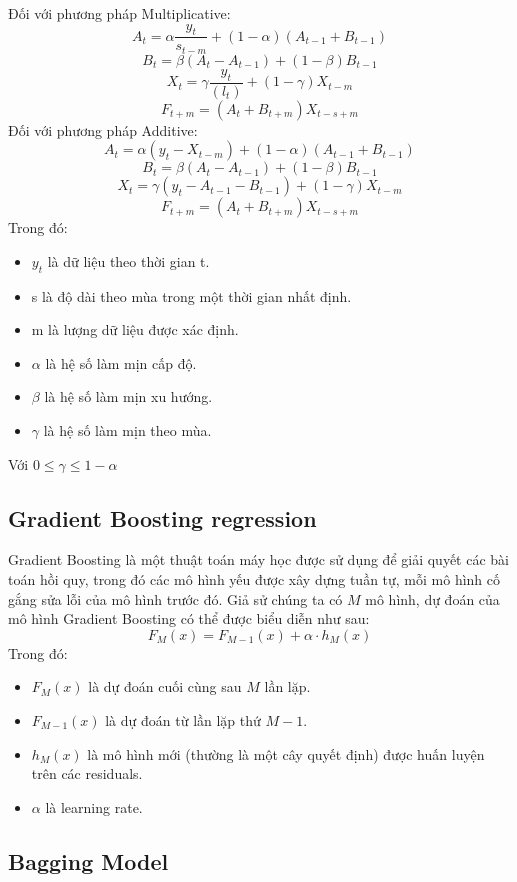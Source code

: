 \documentclass{ieeeojies}
\begin{document}
Đối với phương pháp Multiplicative:
\[
A_{t} = \alpha\frac{y_{t}}{s_{t-m}} + (1 - \alpha)(A_{t-1} + B_{t-1}) 
\]
\[
B_{t} = \beta(A_{t} - A_{t-1}) + (1 - \beta) B_{t-1}   
\]
\[
X_{t} = \gamma\frac{y_{t}}{(l_{t})} + (1 - \gamma) X_{t-m} 
\]
\[
F_{t+m} = (A_{t} + B_{t+m}) X_{t-s+m}    
\]
Đối với phương pháp Additive:
\[
A_{t} = \alpha(y_{t} - X_{t-m}) + (1 - \alpha)(A_{t-1} + B_{t-1})
\]
\[
B_{t} = \beta(A_{t} - A_{t-1}) + (1 - \beta) B_{t-1}   
\]
\[
X_{t} = \gamma(y_{t} - A_{t-1} - B_{t-1}) + (1 - \gamma) X_{t-m}    
\]
\[
F_{t+m} = (A_{t} + B_{t+m}) X_{t-s+m}    
\]
Trong đó:
\begin{itemize}
    \item \(y_{t}\) là dữ liệu theo thời gian t.
    \item s là độ dài theo mùa trong một thời gian nhất định.
    \item m là lượng dữ liệu được xác định.
    \item \(\alpha\) là hệ số làm mịn cấp độ.
    \item \(\beta\) là hệ số làm mịn xu hướng.
    \item \(\gamma\) là hệ số làm mịn theo mùa.
\end{itemize}
Với \(0 \leq \gamma \leq 1-\alpha\)

\subsection{Gradient Boosting regression}
Gradient Boosting là một thuật toán máy học được sử dụng để giải quyết các bài toán hồi quy, trong đó các mô hình yếu được xây dựng tuần tự, mỗi mô hình cố gắng sửa lỗi của mô hình trước đó. 
Giả sử chúng ta có $M$ mô hình, dự đoán của mô hình Gradient Boosting có thể được biểu diễn như sau:
\[
F_M(x) = F_{M-1}(x) + \alpha \cdot h_M(x)
\]
Trong đó:
\begin{itemize}
    \item $F_M(x)$ là dự đoán cuối cùng sau $M$ lần lặp.
    \item $F_{M-1}(x)$ là dự đoán từ lần lặp thứ $M-1$.
    \item $h_M(x)$ là mô hình mới (thường là một cây quyết định) được huấn luyện trên các residuals.
    \item $\alpha$ là learning rate.
\end{itemize}

\subsection{Bagging Model}
\end{document}
